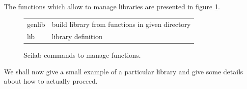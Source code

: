 The functions which allow to manage libraries are presented 
in figure \ref{fig-introscilab-funlibrary}.

\begin{figure}
\begin{center}
\begin{tabular}{|ll|}
\hline
genlib & build library from functions in given directory\\
lib & library definition\\
\hline
\end{tabular}
\end{center}
\caption{Scilab commands to manage functions.}
\label{fig-introscilab-funlibrary}
\end{figure}

We shall now give a small example of a particular library and 
give some details about how to actually proceed.


